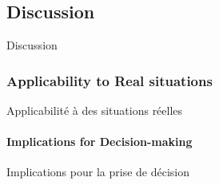 \begin{figure}
\end{figure}





\subsection{Discussion}{Discussion}


\subsubsection{Applicability to Real situations}{Applicabilité à des situations réelles}


\paragraph{Implications for Decision-making}{Implications pour la prise de décision}


